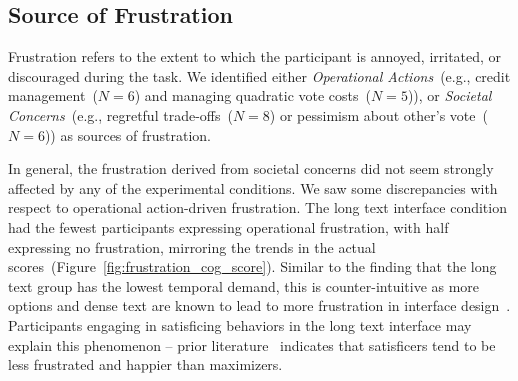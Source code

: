\subsection{Source of Frustration} 
\label{sec:frustration}

Frustration refers to the extent to which the participant is annoyed, irritated, or discouraged during the task. We identified either \textit{Operational Actions}~(e.g., credit management~($N=6$) and managing quadratic vote costs~($N=5$)), or \textit{Societal Concerns}~(e.g., regretful trade-offs~($N=8$) or pessimism about other's vote~($N=6$)) as sources of frustration.

In general, the frustration derived from societal concerns did not seem strongly affected by any of the experimental conditions. We saw some discrepancies with respect to operational action-driven frustration. The long text interface condition had the fewest participants expressing operational frustration, with half expressing no frustration, mirroring the trends in the actual scores~(Figure~\ref{fig:frustration_cog_score}). Similar to the finding that the long text group has the lowest temporal demand, this is counter-intuitive as more options and dense text are known to lead to more frustration in interface design~\cite{nielsen1997users}. Participants engaging in satisficing behaviors in the long text interface may explain this phenomenon -- prior literature~\cite{polmanWhyAreMaximizers2010, schwartzMaximizingSatisficingHappiness2002} indicates that satisficers tend to be less frustrated and happier than maximizers. 



